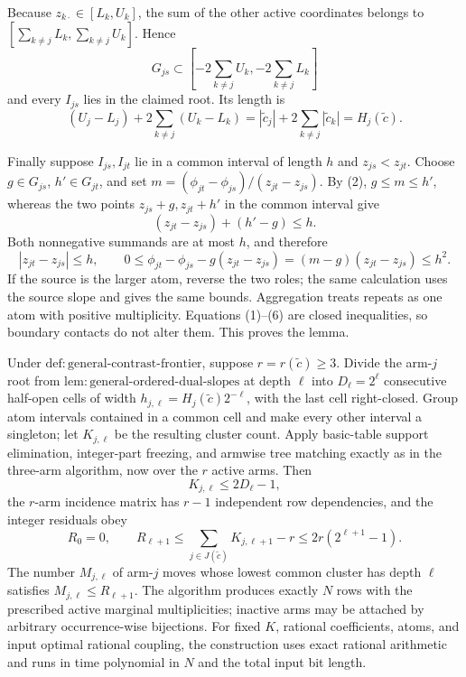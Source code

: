 Because \(z_{k\cdot}\in[L_k,U_k]\), the sum of the other active coordinates belongs to \([\sum_{k\ne j}L_k,\sum_{k\ne j}U_k]\).  Hence
\[
 G_{js}\subset\left[-2\sum_{k\ne j}U_k,-2\sum_{k\ne j}L_k\right]
\]
and every \(I_{js}\) lies in the claimed root.  Its length is
\[
 (U_j-L_j)+2\sum_{k\ne j}(U_k-L_k)
 =|\widetilde c_j|+2\sum_{k\ne j}|\widetilde c_k|
 =H_j(\widetilde c). \tag{4}
\]

Finally suppose \(I_{js},I_{jt}\) lie in a common interval of length \(h\) and \(z_{js}<z_{jt}\).  Choose \(g\in G_{js}\), \(h'\in G_{jt}\), and set \(m=(\phi_{jt}-\phi_{js})/(z_{jt}-z_{js})\).  By (2), \(g\le m\le h'\), whereas the two points \(z_{js}+g,z_{jt}+h'\) in the common interval give
\[
 (z_{jt}-z_{js})+(h'-g)\le h. \tag{5}
\]
Both nonnegative summands are at most \(h\), and therefore
\[
 |z_{jt}-z_{js}|\le h,\qquad
 0\le\phi_{jt}-\phi_{js}-g(z_{jt}-z_{js})
 =(m-g)(z_{jt}-z_{js})\le h^2. \tag{6}
\]
If the source is the larger atom, reverse the two roles; the same calculation uses the source slope and gives the same bounds.  Aggregation treats repeats as one atom with positive multiplicity.  Equations (1)--(6) are closed inequalities, so boundary contacts do not alter them.  This proves the lemma.

Under \(\mathrm{def{:}general\mbox{-}contrast\mbox{-}frontier}\), suppose \(r=r(\widetilde c)\ge3\).  Divide the arm-\(j\) root from \(\mathrm{lem{:}general\mbox{-}ordered\mbox{-}dual\mbox{-}slopes}\) at depth \(\ell\) into \(D_\ell=2^\ell\) consecutive half-open cells of width \(h_{j,\ell}=H_j(\widetilde c)2^{-\ell}\), with the last cell right-closed.  Group atom intervals contained in a common cell and make every other interval a singleton; let \(K_{j,\ell}\) be the resulting cluster count.  Apply basic-table support elimination, integer-part freezing, and armwise tree matching exactly as in the three-arm algorithm, now over the \(r\) active arms.  Then
\[
 K_{j,\ell}\le2D_\ell-1,
\]
the \(r\)-arm incidence matrix has \(r-1\) independent row dependencies, and the integer residuals obey
\[
 R_0=0,\qquad
 R_{\ell+1}\le\sum_{j\in J(\widetilde c)}K_{j,\ell+1}-r
 \le2r(2^{\ell+1}-1).
\]
The number \(M_{j,\ell}\) of arm-\(j\) moves whose lowest common cluster has depth \(\ell\) satisfies \(M_{j,\ell}\le R_{\ell+1}\).  The algorithm produces exactly \(N\) rows with the prescribed active marginal multiplicities; inactive arms may be attached by arbitrary occurrence-wise bijections.  For fixed \(K\), rational coefficients, atoms, and input optimal rational coupling, the construction uses exact rational arithmetic and runs in time polynomial in \(N\) and the total input bit length.

